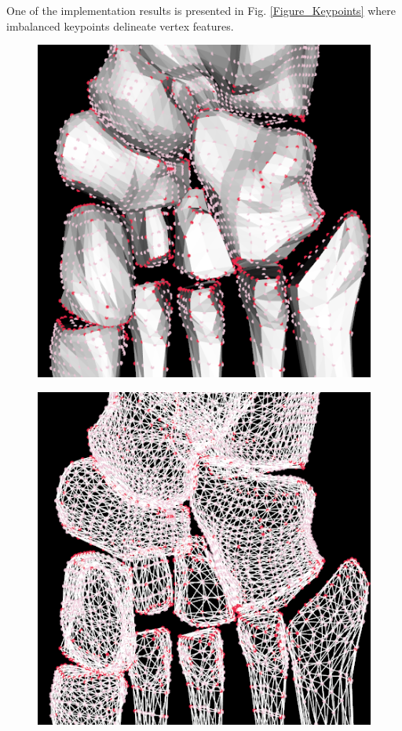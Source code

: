 \documentclass[10pt, conference, compsocconf]{IEEEtran}
\begin{document}
One of the implementation results is presented in Fig. \ref{Figure_Keypoints} where imbalanced keypoints delineate vertex features.

\begin{figure}[htbp]
  \centering

      \begin{minipage}[h]{0.48\linewidth}
        \centering
        \includegraphics[width=\textwidth]{./Figure/keypoint/front.png}\\
      \end{minipage}%
      \begin{minipage}[h]{0.48\linewidth}
        \centering
        \includegraphics[width=\textwidth]{./Figure/keypoint/front-.png}\\

\end{minipage}
\end{figure}
\end{document}
